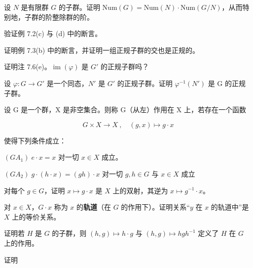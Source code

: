 \exerciseshead

\begin{exercises}
\item

设 $N$ 是有限群 $G$ 的子群。证明 $\text{Num}(G) = \text{Num}(N) \cdot \text{Num}(G/N)$，从而特别地，子群的阶整除群的阶。

\item

验证例 7.2(c) 与 (d) 中的断言。

\item

证明例 7.3(b) 中的断言，并证明一组正规子群的交也是正规的。

\item

证明注 7.6(e)。$ \operatorname{im}(\varphi) $ 是 $ G' $ 的正规子群吗？

\item

设 $ \varphi: G \to G' $ 是一个同态，$ N' $ 是 $ G' $ 的正规子群。证明 $ \varphi^{-1}(N') $ 是 G 的正规子群。

\item

设 G 是一个群，X 是非空集合。则称 G（从左）作用在 X 上，若存在一个函数

\[
G\times X\to X~,\quad(g,x)\mapsto g\cdot x
\]

使得下列条件成立：

$ (GA_1)\;e \cdot x = x $ 对一切 $ x \in X $ 成立。

$ (GA_2)\;g\cdot(h\cdot x)=(gh)\cdot x $ 对一切 $ g,h\in G $ 与 $ x\in X $ 成立

\begin{items}
\item

对每个 $g \in G$，证明 $x \mapsto g \cdot x$ 是 $X$ 上的双射，其逆为 $x \mapsto g^{-1} \cdot x$。

\item

对 $ x \in X $，$ G \cdot x $ 称为 $ x $ 的\textbf{轨道}（在 $ G $ 的作用下）。证明关系“$ y $ 在 $ x $ 的轨道中”是 $ X $ 上的等价关系。

\item

证明若 $H$ 是 $G$ 的子群，则 $(h,g) \mapsto h \cdot g$ 与 $(h,g) \mapsto hgh^{-1}$ 定义了 $H$ 在 $G$ 上的作用。

\item

证明


\end{items}
\end{exercises}
